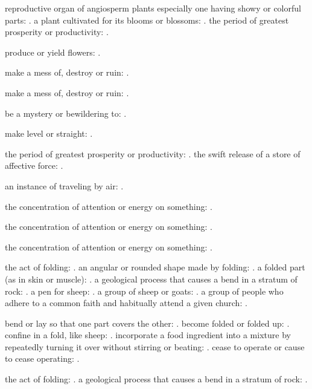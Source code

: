   reproductive organ of angiosperm plants especially one having showy or colorful parts: . a plant cultivated for its blooms or blossoms: . the period of greatest prosperity or productivity: .

  produce or yield flowers: .

  make a mess of, destroy or ruin: .

  make a mess of, destroy or ruin: .

  be a mystery or bewildering to: .

  make level or straight: .

  the period of greatest prosperity or productivity: . the swift release of a store of affective force: .

  an instance of traveling by air: .

  the concentration of attention or energy on something: .

  the concentration of attention or energy on something: .

  the concentration of attention or energy on something: .

  the act of folding: . an angular or rounded shape made by folding: . a folded part (as in skin or muscle): . a geological process that causes a bend in a stratum of rock: . a pen for sheep: . a group of sheep or goats: . a group of people who adhere to a common faith and habitually attend a given church: .

  bend or lay so that one part covers the other: . become folded or folded up: . confine in a fold, like sheep: . incorporate a food ingredient into a mixture by repeatedly turning it over without stirring or beating: . cease to operate or cause to cease operating: .

  the act of folding: . a geological process that causes a bend in a stratum of rock: .

